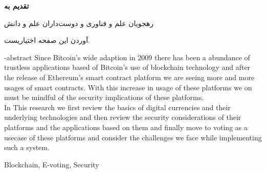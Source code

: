 \documentclass[oneside,openany,msc]{SBU-Thesis}
\begin{document}
\rightsPage %
\copyRightPage %

{
	\newpage
	\thispagestyle{plain}
	\large{\textbf{تقدیم به}}
	
	\begin{center}
		رهجويان علم و فناوری و دوست‌داران علم و دانش
	\end{center}
	
	\vspace{14cm}	
	آوردن این صفحه اختیاریست.
	
	\pagebreak
}
\tableofcontents %
\listoffigures \newpage %
\listoftables \newpage %

	
\abstractPage %
		




	

\newpage


\en-abstract
{
	Since Bitcoin's wide adaption in 2009 there has been a abundance of trustless applications based of Bitcoin's use of blockchain technology and after the release of Ethereum's smart contract platform we are seeing more and more usages of smart contracts. With this increase in usage of these platforms we on must be mindful of the security implications of these platforms. \\
	In This research we first review the basics of digital currencies and their underlying technologies and then review the security considerations of their platforms and the applications based on them and finally move to voting as a usecase of these platforms and consider the challenges we face while implementing such a system.
}

\latinkeywords
{
 Blockchain, E-voting, Security
}

\latinAbstractPage %
\latinFirstPage %

	
\end{document}
